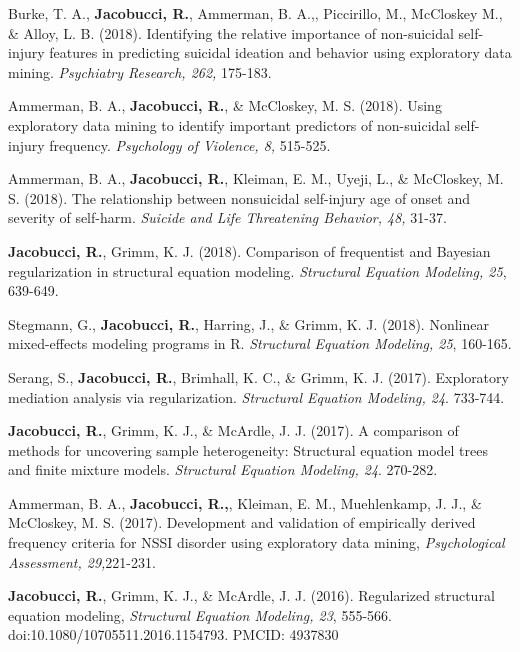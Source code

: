\documentclass[letterpaper,10pt]{article}
\begin{document}
\begin{etaremune}
	\item Burke, T. A., \textbf{Jacobucci, R.}, Ammerman, B. A.,, Piccirillo, M., McCloskey M., \& Alloy, L. B. (2018). Identifying the relative importance of non-suicidal self-injury features in predicting suicidal ideation and behavior using exploratory data mining. \emph{Psychiatry Research, 262,} 175-183.
	\item Ammerman, B. A., \textbf{Jacobucci, R.}, \& McCloskey, M. S. (2018). Using exploratory data mining to identify important predictors of non-suicidal self-injury frequency. \emph{Psychology of Violence, 8,} 515-525.
	\item Ammerman, B. A., \textbf{Jacobucci, R.}, Kleiman, E. M., Uyeji, L., \& McCloskey, M. S. (2018). The relationship between nonsuicidal self-injury age of onset and severity of self-harm. \emph{Suicide and Life Threatening Behavior, 48,} 31-37.
	\item  \textbf{Jacobucci, R.}, Grimm, K. J. (2018). Comparison of frequentist and Bayesian regularization in structural equation modeling. \emph{Structural Equation Modeling, 25}, 639-649.
	\item Stegmann, G., \textbf{Jacobucci, R.}, Harring, J., \& Grimm, K. J. (2018). Nonlinear mixed-effects modeling programs in R. \emph{Structural Equation Modeling, 25}, 160-165.
	\item Serang, S., \textbf{Jacobucci, R.}, Brimhall, K. C., \& Grimm, K. J. (2017). Exploratory mediation analysis via regularization. \emph{Structural Equation Modeling, 24}. 733-744.
	\item \textbf{Jacobucci, R.}, Grimm, K. J., \& McArdle, J. J. (2017). A comparison of methods for uncovering sample heterogeneity: Structural equation model trees and finite mixture models. \emph{Structural Equation Modeling, 24}. 270-282.
	\item Ammerman, B. A., \textbf{Jacobucci, R.,}, Kleiman, E. M., Muehlenkamp, J. J., \& McCloskey, M. S. (2017). Development and validation of empirically derived frequency criteria for NSSI disorder using exploratory data mining, \emph{Psychological Assessment, 29,}221-231.
	\item \textbf{Jacobucci, R.}, Grimm, K. J., \& McArdle, J. J. (2016). Regularized structural equation modeling, \emph{Structural Equation Modeling, 23}, 555-566. doi:10.1080/10705511.2016.1154793. PMCID: 4937830

\end{etaremune}
\end{document}
